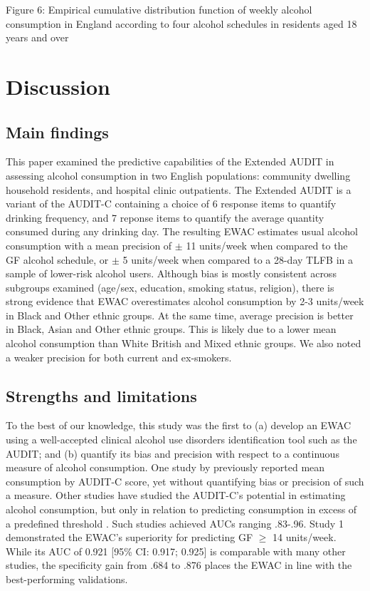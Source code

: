 \documentclass[]{article}
\begin{document}
Figure 6: Empirical cumulative distribution function of weekly alcohol
consumption in England according to four alcohol schedules in residents
aged 18 years and over

\hypertarget{discussion}{%
\section{Discussion}\label{discussion}}

\hypertarget{main-findings}{%
\subsection{Main findings}\label{main-findings}}

This paper examined the predictive capabilities of the Extended AUDIT in
assessing alcohol consumption in two English populations: community
dwelling household residents, and hospital clinic outpatients. The
Extended AUDIT is a variant of the AUDIT-C containing a choice of 6
response items to quantify drinking frequency, and 7 reponse items to
quantify the average quantity consumed during any drinking day. The
resulting EWAC estimates usual alcohol consumption with a mean precision
of \(\pm\) 11 units/week when compared to the GF alcohol schedule, or
\(\pm\) 5 units/week when compared to a 28-day TLFB in a sample of
lower-risk alcohol users. Although bias is mostly consistent across
subgroups examined (age/sex, education, smoking status, religion), there
is strong evidence that EWAC overestimates alcohol consumption by 2-3
units/week in Black and Other ethnic groups. At the same time, average
precision is better in Black, Asian and Other ethnic groups. This is
likely due to a lower mean alcohol consumption than White British and
Mixed ethnic groups. We also noted a weaker precision for both current
and ex-smokers.

\hypertarget{strengths-and-limitations}{%
\subsection{Strengths and limitations}\label{strengths-and-limitations}}

To the best of our knowledge, this study was the first to (a) develop an
EWAC using a well-accepted clinical alcohol use disorders identification
tool such as the AUDIT; and (b) quantify its bias and precision with
respect to a continuous measure of alcohol consumption. One study by
\citep{Rubinsky2013} previously reported mean consumption by AUDIT-C
score, yet without quantifying bias or precision of such a measure.
Other studies have studied the AUDIT-C's potential in estimating alcohol
consumption, but only in relation to predicting consumption in excess of
a predefined threshold \citep{DeMeneses-Gaya2009}. Such studies achieved
AUCs ranging .83-.96. Study 1 demonstrated the EWAC's superiority for
predicting GF \(\geq\) 14 units/week. While its AUC of 0.921 {[}95\% CI:
0.917; 0.925{]} is comparable with many other studies, the specificity
gain from .684 to .876 places the EWAC in line with the best-performing
validations.
\end{document}
